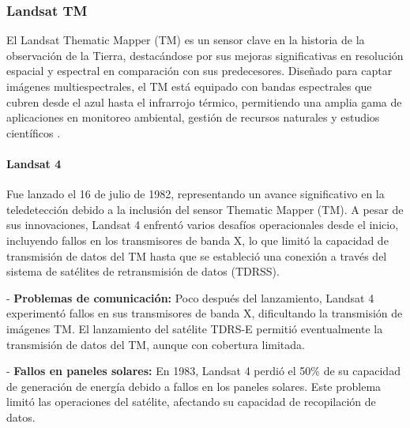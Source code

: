             \subsubsection{Landsat TM}
                El Landsat Thematic Mapper (TM) es un sensor clave en la historia de la observación de la Tierra, destacándose por sus mejoras significativas en resolución espacial y espectral en comparación con sus predecesores. Diseñado para captar imágenes multiespectrales, el TM está equipado con bandas espectrales que cubren desde el azul hasta el infrarrojo térmico, permitiendo una amplia gama de aplicaciones en monitoreo ambiental, gestión de recursos naturales y estudios científicos \autocite{landsat_legacy}.

                \paragraph{Landsat 4}
                    Fue lanzado el 16 de julio de 1982, representando un avance significativo en la teledetección debido a la inclusión del sensor Thematic Mapper (TM). A pesar de sus innovaciones, Landsat 4 enfrentó varios desafíos operacionales desde el inicio, incluyendo fallos en los transmisores de banda X, lo que limitó la capacidad de transmisión de datos del TM hasta que se estableció una conexión a través del sistema de satélites de retransmisión de datos (TDRSS).
                    
                    - \textbf{Problemas de comunicación:} Poco después del lanzamiento, Landsat 4 experimentó fallos en sus transmisores de banda X, dificultando la transmisión de imágenes TM. El lanzamiento del satélite TDRS-E permitió eventualmente la transmisión de datos del TM, aunque con cobertura limitada.
                    
                    - \textbf{Fallos en paneles solares:} En 1983, Landsat 4 perdió el 50\% de su capacidad de generación de energía debido a fallos en los paneles solares. Este problema limitó las operaciones del satélite, afectando su capacidad de recopilación de datos.

